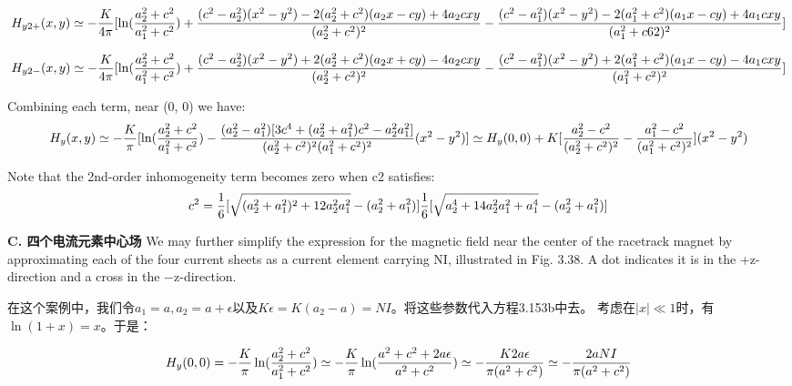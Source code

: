 $$
H_{y2+}(x,y)\simeq-\frac{K}{4\pi}[\ln(\frac{a_{2}^{2}+c^{2}}{a_{1}^{2}+c^{2}})+\frac{(c^{2}-a_{2}^{2})(x^{2}-y^{2})-2(a_{2}^{2}+c^{2})(a_{2}x-cy)+4a_{2}cxy}{(a_{2}^{2}+c^{2})^{2}}\\
-\frac{(c^{2}-a_{1}^{2})(x^{2}-y^{2})-2(a_{1}^{2}+c^{2})(a_{1}x-cy)+4a_{1}cxy}{(a_{1}^{2}+c6{2})^{2}}]\\%
$$

$$
H_{y2-}(x,y)\simeq-\frac{K}{4\pi}[\ln(\frac{a_{2}^{2}+c^{2}}{a_{1}^{2}+c^{2}})+\frac{(c^{2}-a_{2}^{2})(x^{2}-y^{2})+2(a_{2}^{2}+c^{2})(a_{2}x+cy)-4a_{2}cxy}{(a_{2}^{2}+c^{2})^{2}}\\
-\frac{(c^{2}-a_{1}^{2})(x^{2}-y^{2})+2(a_{1}^{2}+c^{2})(a_{1}x-cy)-4a_{1}cxy}{(a_{1}^{2}+c^{2})^{2}}]\\%
$$

Combining each term, near (0, 0) we have:
$$
H_{y}(x,y)\simeq-\frac{K}{\pi}[\ln(\frac{a_{2}^{2}+c^{2}}{a_{1}^{2}+c^{2}})-\frac{(a_{2}^{2}-a_{1}^{2})[3c^{4}+(a_{2}^{2}+a_{1}^{2})c^{2}-a_{2}^{2}a_{1}^{2}]}{(a_{2}^{2}+c^{2})^{2}(a_{1}^{2}+c^{2})^{2}}(x^{2}-y^{2})]\\
\simeq H_{y}(0,0)+K[\frac{a_{2}^{2}-c^{2}}{(a_{2}^{2}+c^{2})^{2}}-\frac{a_{1}^{2}-c^{2}}{(a_{1}^{2}+c^{2})^{2}}](x^{2}-y^{2})\\%
$$

Note that the 2nd-order inhomogeneity term becomes zero when c2 satisfies:
$$
c^{2}=\frac{1}{6}[\sqrt{(a_{2}^{2}+a_{1}^{2})^{2}+12a_{2}^{2}a_{1}^{2}}-(a_{2}^{2}+a_{1}^{2})]\\
\frac{1}{6}[\sqrt{a_{2}^{4}+14a_{2}^{2}a_{1}^{2}+a_{1}^{4}}-(a_{2}^{2}+a_{1}^{2})]\\%
$$

\textbf{C. 四个电流元素中心场}
We may further simplify the expression for the magnetic field near the center
of the racetrack magnet by approximating each of the four current sheets as a
current element carrying NI, illustrated in Fig. 3.38. A dot indicates it is in the
+z-direction and a cross in the −z-direction.

在这个案例中，我们令$a_1=a,a_2=a+\epsilon$以及$K\epsilon=K(a_2-a)=NI$。将这些参数代入方程3.153b中去。
考虑在$|x|\ll 1$时，有$\ln(1+x)=x$。于是：

$$
H_{y}(0,0)=-\frac{K}{\pi}\ln(\frac{a_{2}^{2}+c^{2}}{a_{1}^{2}+c^{2}})\simeq-\frac{K}{\pi}\ln(\frac{a^{2}+c^{2}+2a\epsilon}{a^{2}+c^{2}})\\
\simeq-\frac{K2a\epsilon}{\pi(a^{2}+c^{2})}\simeq-\frac{2aNI}{\pi(a^{2}+c^{2})}\\%
$$

